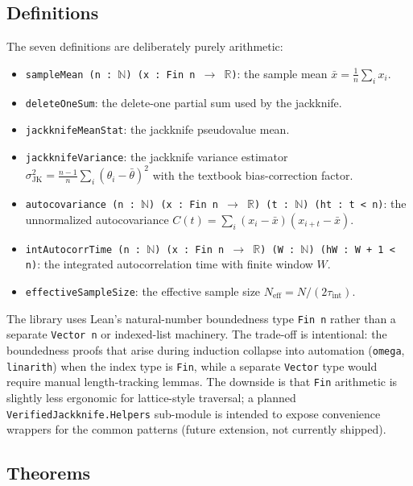 \documentclass[11pt]{article}
\begin{document}
\subsection{Definitions}

The seven definitions are deliberately purely arithmetic:

\begin{itemize}
\item \texttt{sampleMean (n : $\mathbb{N}$) (x : Fin n $\to$
$\mathbb{R}$)}: the sample mean
$\bar{x} = \frac{1}{n} \sum_i x_i$.
\item \texttt{deleteOneSum}: the delete-one partial sum used by
the jackknife.
\item \texttt{jackknifeMeanStat}: the jackknife pseudovalue
mean.
\item \texttt{jackknifeVariance}: the jackknife variance
estimator
$\sigma^2_{\mathrm{JK}} = \frac{n-1}{n} \sum_i (\theta_i - \bar{\theta})^2$
with the textbook bias-correction factor.
\item \texttt{autocovariance (n : $\mathbb{N}$) (x : Fin n $\to$
$\mathbb{R}$) (t : $\mathbb{N}$) (ht : t < n)}:
the unnormalized autocovariance
$C(t) = \sum_i (x_i - \bar{x})(x_{i+t} - \bar{x})$.
\item \texttt{intAutocorrTime (n : $\mathbb{N}$) (x : Fin n $\to$
$\mathbb{R}$) (W : $\mathbb{N}$) (hW : W + 1 < n)}:
the integrated autocorrelation time with finite window $W$.
\item \texttt{effectiveSampleSize}: the effective sample size
$N_{\mathrm{eff}} = N / (2 \tau_{\mathrm{int}})$.
\end{itemize}

The library uses Lean's natural-number boundedness type
\texttt{Fin n} rather than a separate \texttt{Vector n} or
indexed-list machinery. The trade-off is intentional: the boundedness
proofs that arise during induction collapse into automation
(\texttt{omega}, \texttt{linarith}) when the index type is
\texttt{Fin}, while a separate \texttt{Vector} type would require
manual length-tracking lemmas. The downside is that \texttt{Fin}
arithmetic is slightly less ergonomic for lattice-style traversal;
a planned \texttt{VerifiedJackknife.Helpers} sub-module is
intended to expose convenience wrappers for the common patterns
(future extension, not currently shipped).

\subsection{Theorems}
\end{document}
